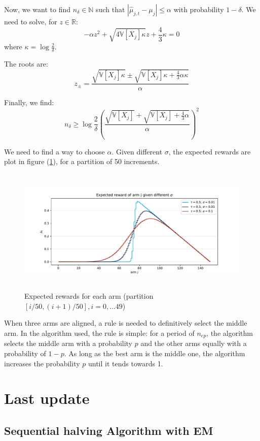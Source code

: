 \documentclass[11pt]{article}
\begin{document}
Now, we want to find $n_{\delta} \in \mathbb{N}$ such that $\left|\hat{\mu}_{j,t} -\mu_j\right| \leq \alpha$ with probability $1 - \delta$. We need to solve, for $z\in \mathbb{R}$:
\[
- \alpha z^2 + \sqrt{4 \mathbb{V}\left[X_j\right] \kappa} z + \frac{4}{3} \kappa = 0
\]
where $\kappa = \log\frac{2}{\delta}.$

The roots are:
\[
z_{\pm} = \frac{\sqrt{\mathbb{V}\left[X_j\right] \kappa} \pm \sqrt{\mathbb{V}\left[X_j\right]\kappa + \frac{4}{3}\alpha \kappa}}{ \alpha}
\]

Finally, we find:
\[
  n_{\delta} \geq \log\frac{2}{\delta} \left(\frac{\sqrt{\mathbb{V}\left[X_j\right] } + \sqrt{\mathbb{V}\left[X_j\right] + \frac{4}{3}\alpha }}{\alpha}\right)^2
\]

We need to find a way to choose $\alpha$. Given different $\sigma$, the expected rewards are plot in figure (\ref{fig:partition50}), for a partition of 50 increments.

\begin{figure}[H]
  \centering
  \includegraphics[height=6cm]{"../../figures/expect_rew_partition50.pdf"}
  \caption{Expected rewards for each arm (partition $[i/50, (i+1)/50], i = 0,\dots 49$)}
  \label{fig:partition50}
\end{figure}

When three arms are aligned, a rule is needed to definitively select the middle arm. 
In the algorithm used, the rule is simple: for a period of $n_{ep}$, the algorithm selects 
the middle arm with a probability $p$ and the other arms equally with a probability of $1 - p$. 
As long as the best arm is the middle one, the algorithm increases the probability $p$ until it tends towards 1.


\section{Last update}
\subsection*{Sequential halving Algorithm with EM}
\end{document}
